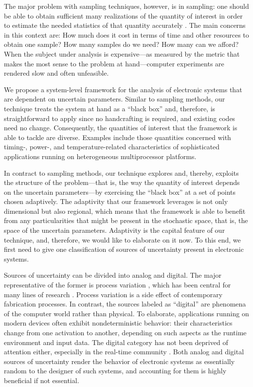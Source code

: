 The major problem with sampling techniques, however, is in sampling: one should
be able to obtain sufficient many realizations of the quantity of interest in
order to estimate the needed statistics of that quantity accurately
\cite{diaz-emparanza2002}. The main concerns in this context are: How much does
it cost in terms of time and other resources to obtain one sample? How many
samples do we need? How many can we afford? When the subject under analysis is
expensive---as measured by the metric that makes the most sense to the problem
at hand---computer experiments are rendered slow and often unfeasible.

We propose a system-level framework for the analysis of electronic systems that
are dependent on uncertain parameters. Similar to sampling methods, our
technique treats the system at hand as a ``black box'' and, therefore, is
straightforward to apply since no handcrafting is required, and existing codes
need no change. Consequently, the quantities of interest that the framework is
able to tackle are diverse. Examples include those quantities concerned with
timing-, power-, and temperature-related characteristics of sophisticated
applications running on heterogeneous multiprocessor platforms.

In contract to sampling methods, our technique explores and, thereby, exploits
the structure of the problem---that is, the way the quantity of interest depends
on the uncertain parameters---by exercising the ``black box'' at a set of points
chosen adaptively. The adaptivity that our framework leverages is not only
dimensional \cite{klimke2006} but also regional, which means that the framework
is able to benefit from any particularities that might be present in the
stochastic space, that is, the space of the uncertain parameters. Adaptivity is
the capital feature of our technique, and, therefore, we would like to elaborate
on it now. To this end, we first need to give one classification of sources of
uncertainty present in electronic systems.

Sources of uncertainty can be divided into analog and digital. The major
representative of the former is process variation \cite{srivastava2005}, which
has been central for many lines of research \cite{bhardwaj2008, juan2012,
lee2013, ukhov2014, ukhov2015}. Process variation is a side effect of
contemporary fabrication processes. In contrast, the sources labeled as
``digital'' are phenomena of the computer world rather than physical. To
elaborate, applications running on modern devices often exhibit nondeterministic
behavior: their characteristics change from one activation to another, depending
on such aspects as the runtime environment and input data. The digital category
has not been deprived of attention either, especially in the real-time community
\cite{quinton2012, diaz2002, santinelli2011, yang2013, tanasa2015}. Both analog
and digital sources of uncertainty render the behavior of electronic systems as
essentially random to the designer of such systems, and accounting for them is
highly beneficial if not essential.

